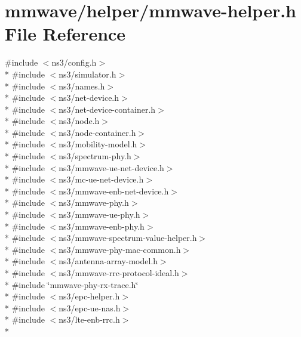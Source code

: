 \hypertarget{mmwave-helper_8h}{}\section{mmwave/helper/mmwave-\/helper.h File Reference}
\label{mmwave-helper_8h}
{\ttfamily \#include $<$ns3/config.\+h$>$}\\*
{\ttfamily \#include $<$ns3/simulator.\+h$>$}\\*
{\ttfamily \#include $<$ns3/names.\+h$>$}\\*
{\ttfamily \#include $<$ns3/net-\/device.\+h$>$}\\*
{\ttfamily \#include $<$ns3/net-\/device-\/container.\+h$>$}\\*
{\ttfamily \#include $<$ns3/node.\+h$>$}\\*
{\ttfamily \#include $<$ns3/node-\/container.\+h$>$}\\*
{\ttfamily \#include $<$ns3/mobility-\/model.\+h$>$}\\*
{\ttfamily \#include $<$ns3/spectrum-\/phy.\+h$>$}\\*
{\ttfamily \#include $<$ns3/mmwave-\/ue-\/net-\/device.\+h$>$}\\*
{\ttfamily \#include $<$ns3/mc-\/ue-\/net-\/device.\+h$>$}\\*
{\ttfamily \#include $<$ns3/mmwave-\/enb-\/net-\/device.\+h$>$}\\*
{\ttfamily \#include $<$ns3/mmwave-\/phy.\+h$>$}\\*
{\ttfamily \#include $<$ns3/mmwave-\/ue-\/phy.\+h$>$}\\*
{\ttfamily \#include $<$ns3/mmwave-\/enb-\/phy.\+h$>$}\\*
{\ttfamily \#include $<$ns3/mmwave-\/spectrum-\/value-\/helper.\+h$>$}\\*
{\ttfamily \#include $<$ns3/mmwave-\/phy-\/mac-\/common.\+h$>$}\\*
{\ttfamily \#include $<$ns3/antenna-\/array-\/model.\+h$>$}\\*
{\ttfamily \#include $<$ns3/mmwave-\/rrc-\/protocol-\/ideal.\+h$>$}\\*
{\ttfamily \#include \char`\"{}mmwave-\/phy-\/rx-\/trace.\+h\char`\"{}}\\*
{\ttfamily \#include $<$ns3/epc-\/helper.\+h$>$}\\*
{\ttfamily \#include $<$ns3/epc-\/ue-\/nas.\+h$>$}\\*
{\ttfamily \#include $<$ns3/lte-\/enb-\/rrc.\+h$>$}\\*
